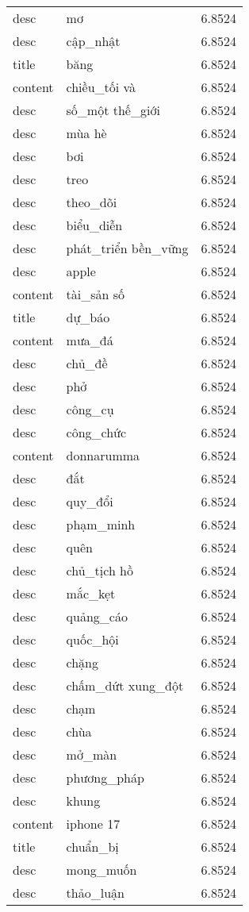 \documentclass{article}
\begin{document}
\begin{tabular}{lll}
desc & mơ & 6.8524\\
desc & cập\_nhật & 6.8524\\
title & băng & 6.8524\\
content & chiều\_tối và & 6.8524\\
desc & số\_một thế\_giới & 6.8524\\
desc & mùa hè & 6.8524\\
desc & bơi & 6.8524\\
desc & treo & 6.8524\\
desc & theo\_dõi & 6.8524\\
desc & biểu\_diễn & 6.8524\\
desc & phát\_triển bền\_vững & 6.8524\\
desc & apple & 6.8524\\
content & tài\_sản số & 6.8524\\
title & dự\_báo & 6.8524\\
content & mưa\_đá & 6.8524\\
desc & chủ\_đề & 6.8524\\
desc & phở & 6.8524\\
desc & công\_cụ & 6.8524\\
desc & công\_chức & 6.8524\\
content & donnarumma & 6.8524\\
desc & đắt & 6.8524\\
desc & quy\_đổi & 6.8524\\
desc & phạm\_minh & 6.8524\\
desc & quên & 6.8524\\
desc & chủ\_tịch hồ & 6.8524\\
desc & mắc\_kẹt & 6.8524\\
desc & quảng\_cáo & 6.8524\\
desc & quốc\_hội & 6.8524\\
desc & chặng & 6.8524\\
desc & chấm\_dứt xung\_đột & 6.8524\\
desc & chạm & 6.8524\\
desc & chùa & 6.8524\\
desc & mở\_màn & 6.8524\\
desc & phương\_pháp & 6.8524\\
desc & khung & 6.8524\\
content & iphone 17 & 6.8524\\
title & chuẩn\_bị & 6.8524\\
desc & mong\_muốn & 6.8524\\
desc & thảo\_luận & 6.8524\\

\end{tabular}
\end{document}
